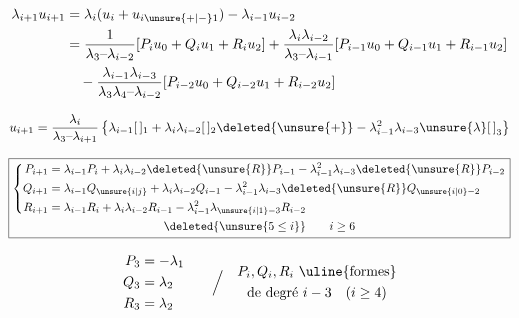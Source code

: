 {\scriptsize
\[
\begin{aligned}
\lambda_{i+1}u_{i+1}
 &=\lambda_i(u_i+u_{i\unsure{+|-}1})-\lambda_{i-1}u_{i-2}\\
 &=\frac{1}{\lambda_3\text{--}\lambda_{i-2}}[P_i u_0+Q_i u_1+R_i u_2]
 +\frac{\lambda_i\lambda_{i-2}}{\lambda_3\text{--}\lambda_{i-1}}[P_{i-1}u_0+Q_{i-1}u_1+R_{i-1}u_2]\\
 &\quad-\frac{\lambda_{i-1}\lambda_{i-3}}{\lambda_3\lambda_4\text{--}\lambda_{i-2}}[P_{i-2}u_0+Q_{i-2}u_1+R_{i-2}u_2]
\end{aligned}
\]
}

\[
u_{i+1}=\frac{\lambda_i}{\lambda_3\text{--}\lambda_{i+1}}
\left\{\lambda_{i-1}[\,]_1+\lambda_i\lambda_{i-2}[\,]_2
\deleted{\unsure{+}}-\lambda_{i-1}^2\lambda_{i-3}\unsure{\lambda}[\,]_3\right\}
\]


\[
\boxed{\begin{gathered}
\left\{\begin{aligned}
P_{i+1}&=\lambda_{i-1}P_i+\lambda_i\lambda_{i-2}\deleted{\unsure{R}}P_{i-1}-\lambda_{i-1}^2\lambda_{i-3}\deleted{\unsure{R}}P_{i-2}\\
Q_{i+1}&=\lambda_{i-1}Q_{\unsure{i|j}}+\lambda_i\lambda_{i-2}Q_{i-1}-\lambda_{i-1}^2\lambda_{i-3}\deleted{\unsure{R}}Q_{\unsure{i|0}-2}\\
R_{i+1}&=\lambda_{i-1}R_i+\lambda_i\lambda_{i-2}R_{i-1}-\lambda_{i-1}^2\lambda_{\unsure{i|1}-3}R_{i-2}
\end{aligned}\right.\\
\deleted{\unsure{5\leq i}}\qquad i\geq6
\end{gathered}}
\]

\[
\begin{aligned}P_3&=-\lambda_1\\Q_3&=\lambda_2\\R_3&=\lambda_2\end{aligned}
\qquad\Big/\quad
\begin{gathered}P_i,Q_i,R_i\ \text{\uline{formes}}\\
\text{de degré }i-3\quad(i\geq4)\end{gathered}
\]

